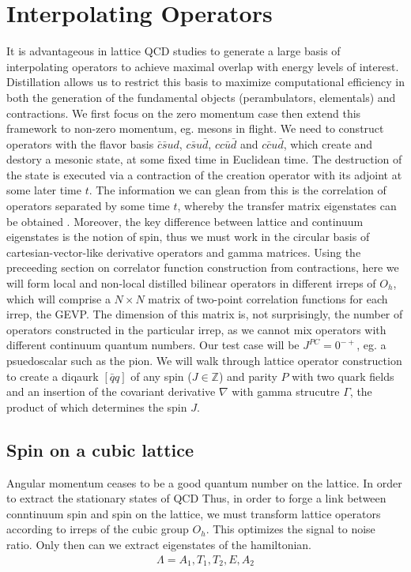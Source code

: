 
\chapter{Interpolating Operators}
\label{sec:ops}

It is advantageous in lattice QCD studies to generate a large basis of interpolating operators to achieve maximal overlap with energy levels of interest. Distillation allows us to restrict this basis to maximize computational efficiency in both the generation of the fundamental objects (perambulators, elementals) and contractions. We first focus on the zero momentum case then extend this framework to non-zero momentum, eg. mesons in flight. We need to construct operators with the flavor basis $\bar c\bar s ud$, $c\bar s u\bar d$, $cc\bar u\bar d$ and $c\bar c u\bar d$, which create and destory a mesonic state, at some fixed time in Euclidean time. The destruction of the state is executed via a contraction of the creation operator with its adjoint at some later time $t$.  The information we can glean from this is the correlation of operators separated by some time $t$, whereby the transfer matrix eigenstates can be obtained . Moreover, the key difference between lattice and continuum eigenstates is the notion of spin, thus we must work in the circular basis of cartesian-vector-like derivative operators and gamma matrices. Using the preceeding section on correlator function construction from contractions, here we will form local and non-local distilled bilinear operators in different irreps of $O_h$, which will comprise a $N \times N$ matrix of two-point correlation functions for each irrep, the GEVP. The dimension of this matrix is, not surprisingly, the number of operators constructed in the particular irrep, as we cannot mix operators with different continuum quantum numbers. Our test case will be $J^{PC} =0^{-+}$, eg. a psuedoscalar such as the pion. We will walk through lattice operator construction to create a diqaurk $[\bar{q}q]$ of any spin ($J \in \mathbb{Z}$) and parity $P$ with two quark fields and an insertion of the covariant derivative $\nabla$ with gamma strucutre $\Gamma$, the product of which determines the spin $J$.  
  

\section{Spin on a cubic lattice}
Angular momentum ceases to be a good quantum number on the lattice. In order to extract the stationary states of QCD   Thus, in order to forge a link between conntinuum spin and spin on the lattice, we must transform lattice operators according to irreps of the cubic group $O_h$. This optimizes the signal to noise ratio. Only then can we extract eigenstates of the hamiltonian. 
\begin{align}
    \Lambda = {A_1,T_1,T_2,E,A_2}
\end{align}

